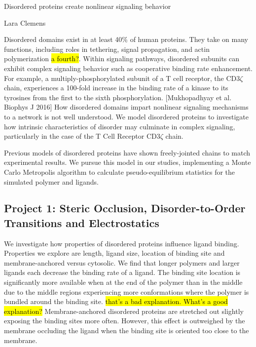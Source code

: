 \documentclass[onecolumn]{article}
\begin{document}
\newcommand{\citel}[1]{\citep{#1}}
\newcommand{\citelt}[1]{\citet{#1}}

\def\Tevac{T_{1/2}^{\mbox{\,\scriptsize evac}}}
\def\Treturn{T_{1/2}^{\mbox{\,\scriptsize return}}}
\def\toffbar{\bar{t}_{\mbox{\scriptsize off}}}
\def\toff{{t}_{\mbox{\scriptsize off}}}
\def\Peclet{P\'{e}clet}


\begin{center}
\Large
Disordered proteins create nonlinear signaling behavior

\large
Lara Clemens
\date{}

\end{center}
\normalsize



Disordered domains exist in at least 40\% of human proteins. They take on many functions, including roles in tethering, signal propagation, and actin polymerization \hl{a fourth?}. Within signaling pathways, disordered subunits can exhibit complex signaling behavior such as cooperative binding rate enhancement. For example, a multiply-phosphorylated subunit of a T cell receptor, the CD3$\zeta$ chain, experiences a 100-fold increase in the binding rate of a kinase to its tyrosines from the first to the sixth phosphorylation. [Mukhopadhyay et al. Biophys J 2016] How disordered domains impart nonlinear signaling mechanisms to a network is not well understood. We model disordered proteins to investigate how intrinsic characteristics of disorder may culminate in complex signaling, particularly in the case of the T Cell Receptor CD3$\zeta$ chain. 

Previous models of disordered proteins have shown freely-jointed chains to match experimental results. We pursue this model in our studies, implementing a Monte Carlo Metropolis algorithm to calculate pseudo-equilibrium statistics for the simulated polymer and ligands. 

\subsection*{Project 1: Steric Occlusion, Disorder-to-Order Transitions and Electrostatics}

We investigate how properties of disordered proteins influence ligand binding. Properties we explore are length, ligand size, location of binding site and membrane-anchored versus cytosolic. We find that longer polymers and larger ligands each decrease the binding rate of a ligand. The binding site location is significantly more available when at the end of the polymer than in the middle due to the middle regions experiencing more conformations where the polymer is bundled around the binding site. \hl{that's a bad explanation.  What's a good explanation?} Membrane-anchored disordered proteins are stretched out slightly exposing the binding sites more often.  However, this effect is outweighed by the membrane occluding the ligand when the binding site is oriented too close to the membrane.
\end{document}
